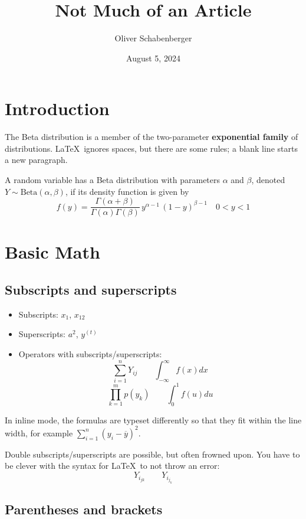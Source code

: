 \documentclass[11pt,oneside, letterpaper]{article}
\title{Not Much of an Article}
\author{Oliver Schabenberger}
\date{August 5, 2024}   %
\begin{document}
\maketitle

\newcommand{\bincoef}[2]{{#1 \choose #2}}
\newcommand{\binco}[2][n]{{#1 \choose #2}}

\section{Introduction}

The Beta distribution is a member of the two-parameter
\textbf{exponential family} of distributions. 
\LaTeX\ ignores spaces, but there are some rules; a blank line starts a new paragraph.

A random variable has a Beta distribution with parameters $\alpha$ and $\beta$,
denoted $Y \sim \text{Beta}(\alpha,\beta)$, if its density function is given 
by 
$$
f(y) = \frac{\Gamma(\alpha+\beta)}{\Gamma(\alpha)\Gamma(\beta)}\, y^{\alpha-1}\,(1-y)^{\beta-1}\quad 0 < y < 1
$$

\section{Basic Math}

\subsection{Subscripts and superscripts}

\begin{itemize}
	\item Subscripts: $x_1$, $x_{12}$
	\item Superscripts: $a^2$, $y^{(t)}$
	\item Operators with subscripts/superscripts:
	$$ \sum_{i=1}^n Y_{ij} \qquad  \int_{-\infty}^\infty f(x) dx$$
	$$ \prod_{k=1}^m p(y_k) \qquad \int_0^1 f(u) du$$
	
\end{itemize}

In inline mode, the formulas are typeset differently so that they fit within the line width,
for example $\sum_{i=1}^n (y_i - \overline{y})^2$.

Double subscripts/superscripts are possible, but often frowned upon. You have to be clever
with the syntax for \LaTeX\ to not throw an error:
$$
Y_{i_{jk}}  \qquad Y_{i_{j_k}}
$$

\subsection{Parentheses and brackets}
\end{document}
